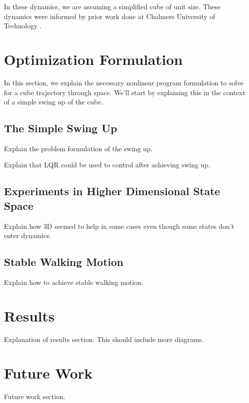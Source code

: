 \documentclass[conference]{IEEEtran}
\begin{document}
In these dynamics, we are assuming a simplified cube of unit size. These dynamics were informed by prior work done at Chalmers University of Technology \cite{b4}.


\section{Optimization Formulation}
In this section, we explain the necessary nonlinear program formulation to solve for a cube trajectory through space. We'll start by explaining this in the context of a simple swing up of the cube.

\subsection{The Simple Swing Up}
Explain the problem formulation of the swing up.

Explain that LQR could be used to control after achieving swing up.

\subsection{Experiments in Higher Dimensional State Space}
Explain how 3D seemed to help in some cases even though some states don't enter dynamics.

\subsection{Stable Walking Motion}

Explain how to achieve stable walking motion.

\section*{Results}

Explanation of results section. This should include more diagrams.

\section*{Future Work}

Future work section.
\end{document}
